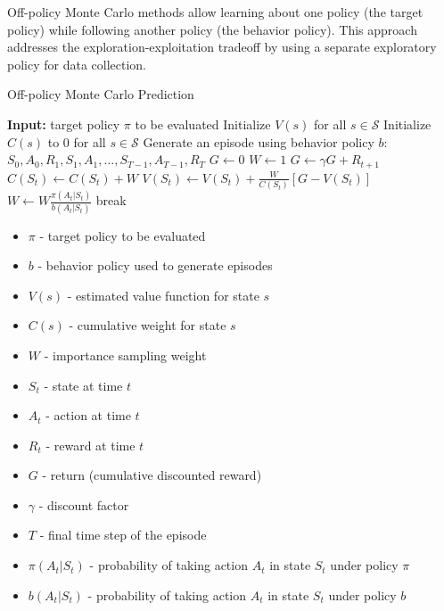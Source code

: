 \documentclass[11pt,a4paper]{article}
\begin{document}
Off-policy Monte Carlo methods allow learning about one policy (the target policy) while following another policy (the behavior policy). This approach addresses the exploration-exploitation tradeoff by using a separate exploratory policy for data collection.

\begin{algorithm}[H]
\caption{Off-policy Monte Carlo Prediction}
\begin{algorithmic}[1]
\State \textbf{Input:} target policy $\pi$ to be evaluated
\State Initialize $V(s)$ for all $s \in \mathcal{S}$
\State Initialize $C(s)$ to 0 for all $s \in \mathcal{S}$
    \State Generate an episode using behavior policy $b$: $S_0, A_0, R_1, S_1, A_1, \ldots, S_{T-1}, A_{T-1}, R_T$
    \State $G \gets 0$
    \State $W \gets 1$
        \State $G \gets \gamma G + R_{t+1}$
        \State $C(S_t) \gets C(S_t) + W$
        \State $V(S_t) \gets V(S_t) + \frac{W}{C(S_t)}[G - V(S_t)]$
        \State $W \gets W \frac{\pi(A_t|S_t)}{b(A_t|S_t)}$
            \State break
        \EndIf
    \EndFor
\EndFor
\end{algorithmic}
\end{algorithm}

\begin{tcolorbox}[title=Notation Overview]
\begin{itemize}
    \item $\pi$ - target policy to be evaluated
    \item $b$ - behavior policy used to generate episodes
    \item $V(s)$ - estimated value function for state $s$
    \item $C(s)$ - cumulative weight for state $s$
    \item $W$ - importance sampling weight
    \item $S_t$ - state at time $t$
    \item $A_t$ - action at time $t$
    \item $R_t$ - reward at time $t$
    \item $G$ - return (cumulative discounted reward)
    \item $\gamma$ - discount factor
    \item $T$ - final time step of the episode
    \item $\pi(A_t|S_t)$ - probability of taking action $A_t$ in state $S_t$ under policy $\pi$
    \item $b(A_t|S_t)$ - probability of taking action $A_t$ in state $S_t$ under policy $b$
\end{itemize}
\end{tcolorbox}
\end{document}
